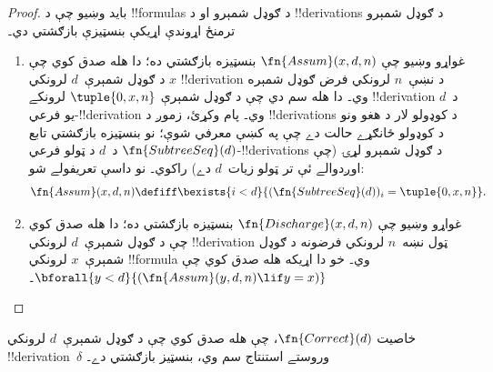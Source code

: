 \documentclass[../../../include/open-logic-section]{subfiles}
\begin{document}
\begin{proof}
  بايد وښيو چې د !!{formula}s د ګوډل شمېرو او د !!{derivation}s د
  ګوډل شمېرو ترمنځ اړوندې اړيکې بنسټيزې بازګشتي دي۔
  \begin{enumerate}
  \item غواړو وښيو چې $\fn{Assum}(x,d,n)$ بنسټيزه بازګشتي ده؛ دا
    هله صدق کوي چې $x$ د ګوډل شمېرې~$d$ لرونکي !!{derivation} د
    نښې~$n$ لرونکي فرض ګوډل شمېره وي۔ دا هله سم دي چې د ګوډل شمېرې
    $\tuple{0,x,n}$ لرونکے !!{derivation} د~$d$ يو
    فرعي-!!{derivation} وي۔ پام وکړئ، زموږ د !!{derivation}s د کوډولو
    لار د هغو ونو د کوډولو ځانګړے حالت دے چې په
     کښې معرفي شوې؛ نو بنسټيزه بازګشتي
    تابع $\fn{SubtreeSeq}(d)$ د~$d$ د ټولو فرعي-!!{derivation}s د
    ګوډل شمېرو لړۍ (چې اوږدوالے ئې تر ټولو زيات~$d$ دے) راکوي۔ نو
    داسې تعريفولے شو:
    \[
    \fn{Assum}(x, d, n) \defiff \bexists{i<d}{(\fn{SubtreeSeq}(d))_i =
      \tuple{0, x, n}}.
    \]
  \item غواړو وښيو چې $\fn{Discharge}(x,d,n)$ بنسټيزه بازګشتي ده؛
    دا هله صدق کوي چې د ګوډل شمېرې~$d$ لرونکي !!{derivation} ټول
    نښه~$n$ لرونکي فرضونه د ګوډل شمېرې~$x$ لرونکي !!{formula} وي۔
    خو دا اړيکه هله صدق کوي چې
    $\bforall{y<d}{(\fn{Assum}(y,d,n)\lif y=x)}$۔
  \end{enumerate}
\end{proof}

\begin{prop}
  خاصيت $\fn{Correct}(d)$، چې هله صدق کوي چې د ګوډل شمېرې~$d$
  لرونکي !!{derivation}~$\delta$ وروستے استنتاج سم وي، بنسټيز
  بازګشتي دے۔
\end{prop}
\end{document}
